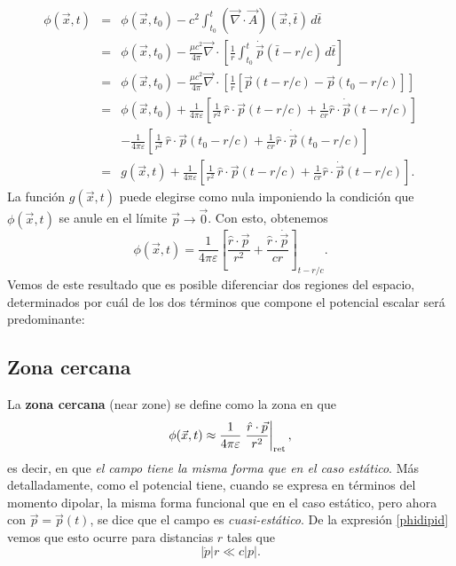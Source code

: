 \begin{eqnarray}
\phi(\vec{x},t)&=&\phi(\vec{x},t_0)-c^2\int_{t_0}^t(\vec{\nabla}\cdot\vec{A})(\vec{x},\bar{t})\,d\bar{t} \\
&=&\phi(\vec{x},t_0)-\frac{\mu c^2}{4\pi} \vec{\nabla}\cdot\left[\frac{1}{r}\int_{t_0}^t\dot{\vec{p}}(\bar{t}-{r}/{c})\,d\bar{t}\right] \\
&=&\phi(\vec{x},t_0)-\frac{\mu c^2}{4\pi} \vec{\nabla}\cdot\left[\frac{1}{r}\left[\vec{p}(t-{r}/{c})-\vec{p}(t_0-{r}/{c})\right]\right] \\
&=&\phi(\vec{x},t_0)+\frac{1}{4\pi\varepsilon}\left[\frac{1}{r^2}\,\hat{r}\cdot\vec{p}(t-{r}/{c})+\frac{1}{cr}\hat{r}\cdot\dot{\vec{p}}(t-{r}/{c})\right] \nonumber\\
&& -\frac{1}{4\pi\varepsilon}\left[\frac{1}{r^2}\,\hat{r}\cdot\vec{p}(t_0-{r}/{c})+\frac{1}{cr}\hat{r}\cdot\dot{\vec{p}}(t_0-{r}/{c})\right] \\
&=& g(\vec{x},t)+\frac{1}{4\pi\varepsilon}\left[\frac{1}{r^2}\,\hat{r}\cdot\vec{p}(t-{r}/{c})+\frac{1}{cr}\hat{r}\cdot\dot{\vec{p}}(t-{r}/{c})\right] .
\end{eqnarray}
La función $g(\vec{x},t)$ puede elegirse como nula imponiendo la condición que $\phi(\vec{x},t)$ se anule en el límite $\vec{p}\to\vec{0}$. Con esto, obtenemos 
\begin{equation}
\boxed{\phi(\vec{x},t)=\frac{1}{4\pi\varepsilon}\left[\frac{\hat{r}\cdot\vec{p}}{r^2}+\frac{\hat{r}\cdot\dot{\vec{p}}}{cr}\right]_{t-{r}/{c}}.} \label{phidipid}
\end{equation}
Vemos de este resultado que es posible diferenciar dos regiones del espacio, determinados por cuál de los dos términos que compone el potencial escalar será predominante:

\subsection{Zona cercana}

La \textbf{zona cercana} (near zone) se define como la zona en que
\begin{equation}
\phi(\vec{x},t)\approx\frac{1}{4\pi\varepsilon}\left.\frac{\hat{r}\cdot\vec{p}}{r^2}\right|_{\rm ret},
\end{equation}
es decir, en que \textit{el campo tiene la misma forma que en el caso estático}. Más detalladamente, como el potencial tiene, cuando se expresa en términos del momento dipolar, la misma forma funcional que en el caso estático, pero ahora con $\vec{p}=\vec{p}(t)$, se dice que el campo es \textit{cuasi-estático}. De la expresión \eqref{phidipid} vemos que esto ocurre para distancias $r$ tales que
\begin{equation}
|\dot{p}|r\ll c|p|.
\end{equation}

